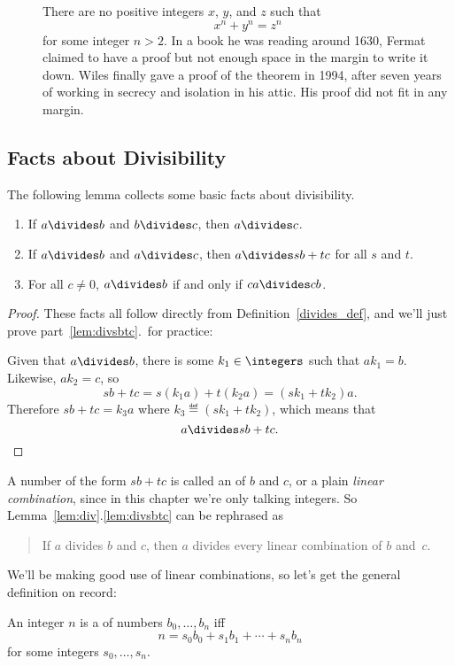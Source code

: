 {\begin{description}
\item[] There are no positive integers $x$,
$y$, and $z$ such that
%
\[
x^n + y^n = z^n
\]
%
for some integer $n > 2$.  In a book he was reading around 1630,
Fermat claimed to have a proof but not enough space in the margin to
write it down.  Wiles finally gave a proof of the theorem in 1994,
after seven years of working in secrecy and isolation in his attic.
His proof did not fit in any margin.

\end{description}
}

\subsection{Facts about Divisibility}

The following lemma collects some basic facts about divisibility.

\begin{lemma}\label{lem:div}\mbox{}
\begin{enumerate}

\item\label{lem:divtrans} If $a \divides b$ and $b \divides c$, then $a \divides c$.

\item\label{lem:divsbtc} If $a \divides b$ and $a \divides c$,
then $a \divides sb + tc$ for all $s$ and $t$.

\item\label{lem:divcancel} For all $c \neq 0$, $a \divides b$ if and only if $ca \divides cb$.
\end{enumerate}
\end{lemma}

\begin{proof}
These facts all follow directly from Definition~\ref{divides_def}, and
we'll just prove part~\ref{lem:divsbtc}.\ for practice:

Given that $a \divides b$, there is some $k_1 \in \integers$ such that
$a k_1 = b$.  Likewise, $a k_2 = c$, so
\[
sb+tc= s(k_1a) + t(k_2a) = (sk_1+tk_2)a.
\]
Therefore $sb+tc = k_3a$ where $k_3 \eqdef (sk_1+tk_2)$, which means
that
\[
a \divides sb+tc.
\]
\end{proof}

A number of the form $sb+tc$ is called an  of $b$ and $c$, or a plain \emph{linear combination},
since in this chapter we're only talking integers.  So
Lemma~\ref{lem:div}.\ref{lem:divsbtc} can be rephrased as
\begin{quote}
If $a$ divides $b$ and $c$, then $a$ divides every linear combination
of $b$ and~$c$.
\end{quote}
We'll be making good use of linear combinations, so let's get the general
definition on record:
\begin{definition}\label{linear_def}
An integer $n$ is a  of numbers
$b_0,\dots,b_n$ iff
\[
n = s_0b_0+s_1b_1+\cdots+s_nb_n
\]
for some integers $s_0,\dots,s_n$.
\end{definition}

